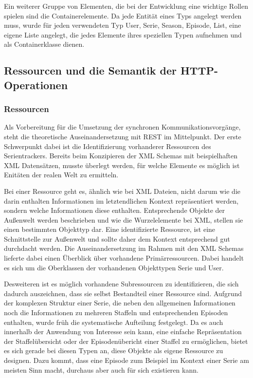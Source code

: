 \documentclass[a4paper]{article}
\begin{document}
Ein weiterer Gruppe von Elementen, die bei der Entwicklung eine wichtige Rollen spielen sind die Containerelemente. Da jede Entität eines Typs angelegt werden muss, wurde für jeden verwendeten Typ User, Serie, Season, Episode, List, eine eigene Liste angelegt, die jedes Elemente ihres speziellen Typen aufnehmen und als Containerklasse dienen.


\newpage

\subsection{Ressourcen und die Semantik der HTTP-Operationen}
\subsubsection{Ressourcen}

Als Vorbereitung für die Umsetzung der synchronen Kommunikationsvorgänge, steht die theoretische Auseinandersetzung mit REST im Mittelpunkt.
Der erste Schwerpunkt dabei ist die Identifizierung vorhanderer Ressourcen des Serientrackers. Bereits beim Konzipieren der XML Schemas mit beispielhaften XML Datensätzen, musste überlegt werden, für welche Elemente es möglich ist Enitäten der realen Welt zu ermitteln.

Bei einer Ressource geht es, ähnlich wie bei XML Dateien, nicht darum wie die darin enthalten Informationen im letztendlichen Kontext repräsentiert werden, sondern welche Informationen diese enthalten. Entsprechende Objekte der Außenwelt werden beschrieben und wie die Wurzelelemente bei XML, stellen sie einen bestimmten Objekttyp dar. Eine identifizierte Ressource, ist eine Schnittstelle zur Außenwelt und sollte daher dem Kontext entsprechend gut durchdacht werden.
Die Auseinandersetzung im Rahmen mit den XML Schemas lieferte dabei einen Überblick über vorhandene Primärressourcen. Dabei handelt es sich um die Oberklassen der vorhandenen Objekttypen Serie und User.

Desweiteren ist es möglich vorhandene Subressourcen zu identifizieren, die sich dadurch auszeichnen, dass sie selbst Bestandteil einer Ressource sind.
Aufgrund der komplexen Struktur einer Serie, die neben den allgemeinen Informationen noch die Informationen zu mehreren Staffeln und entsprechenden Episoden enthalten, wurde früh die systematische Aufteilung festgelegt.
Da es auch innerhalb der Anwendung von Interesse sein kann, eine einfache Repräsentation der Staffelübersicht oder der Episodenübericht einer Staffel zu ermöglichen, bietet es sich gerade bei diesen Typen an, diese Objekte als eigene Ressource zu designen. Dazu kommt, dass eine Episode zum Beispiel im Kontext einer Serie am meisten Sinn macht, durchaus aber auch für sich existieren kann.
\end{document}

